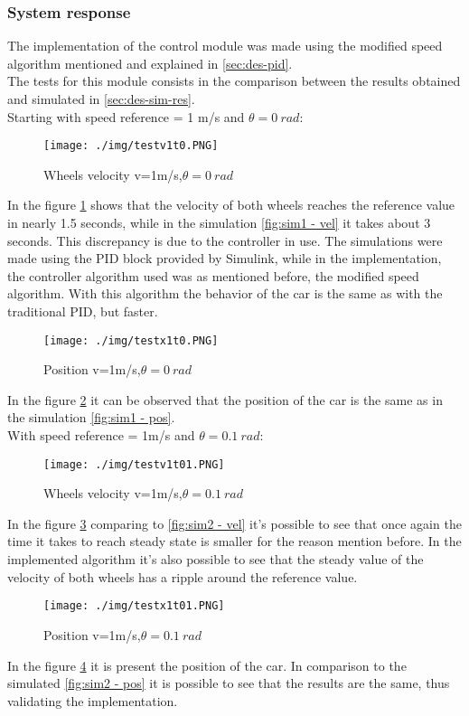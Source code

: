 \subsubsection{System response}
\label{sec:control-testing}
The implementation of the control module was made using the modified speed algorithm mentioned and explained in \ref{sec:des-pid}.\\
The tests for this module consists in the comparison between the results obtained and simulated in \ref{sec:des-sim-res}.\\
Starting with speed reference = 1 m/s and $\theta=0~\si{rad}$:
\begin{figure}[!h]
\centering
\texttt{[image: ./img/testv1t0.PNG]}
\caption {\label{fig:test - vel0}Wheels velocity v=1m/s,$\theta = 0~\si{rad}$}
\end{figure}
In the figure \ref{fig:test - vel0} shows that the velocity of both wheels reaches the reference value in nearly 1.5 seconds, while in the simulation \ref{fig:sim1 - vel} it takes about 3 seconds. This discrepancy is due to the controller in use. The simulations  were made using the PID block provided by Simulink, while in the implementation, the controller algorithm used was as mentioned before, the modified speed algorithm. With this algorithm the behavior of the car is the same as with the traditional PID, but faster.\\
\begin{figure}[!h]
\centering
\texttt{[image: ./img/testx1t0.PNG]}
\caption {\label{fig:test - xy0}Position v=1m/s,$\theta = 0~\si{rad}$}
\end{figure}
In the figure \ref{fig:test - xy0} it can be observed that the position of the car is the same as in the simulation \ref{fig:sim1 - pos}.\\
With speed reference = 1m/s and $\theta = 0.1~\si{rad}$:\\
\begin{figure}[!h]
\centering
\texttt{[image: ./img/testv1t01.PNG]}
\caption {\label{fig:test - vel01}Wheels velocity v=1m/s,$\theta = 0.1~\si{rad}$}
\end{figure}
In the figure \ref{fig:test - vel01} comparing to \ref{fig:sim2 - vel} it's possible to see that once again the time it takes to reach steady state is smaller for the reason mention before. In the implemented algorithm it's also possible to see that the steady value of the velocity of both wheels has a ripple around the reference value. \\
\begin{figure}[!h]
\centering
\texttt{[image: ./img/testx1t01.PNG]}
\caption {\label{fig:test - xy01}Position v=1m/s,$\theta = 0.1~\si{rad}$}
\end{figure}
In the figure \ref{fig:test - xy01} it is present the position of the car. In comparison to the simulated \ref{fig:sim2 - pos} it is possible to see that the results are the same, thus validating the implementation.\\
